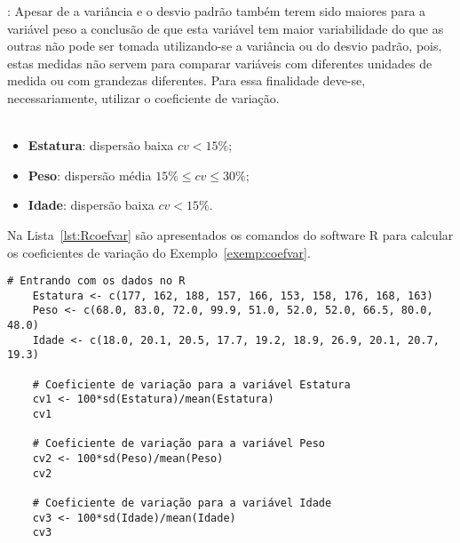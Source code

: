 \documentclass[11pt,fleqn]{book} %
\begin{document}
\begin{example}
: Apesar de a variância e o desvio padrão também terem sido maiores para a variável peso a conclusão de que esta variável tem maior variabilidade do que as outras não pode ser tomada utilizando-se a variância ou do desvio padrão, pois, estas medidas não servem para comparar variáveis com diferentes unidades de medida ou com grandezas diferentes. Para essa finalidade deve-se, necessariamente, utilizar o coeficiente de variação. \\

\vspace{0,3cm}
 \\

\begin{itemize}
\item {\bf Estatura}: dispersão baixa $cv < 15\%$;
\item {\bf Peso}: dispersão média $15\% \leq cv \leq 30\%$;
\item {\bf Idade}: dispersão baixa $cv < 15\%$.
\end{itemize}

\end{example}

\vspace{0,3cm}

Na Lista~\ref{lst:Rcoefvar} são apresentados os comandos do software R para calcular os coeficientes de variação do Exemplo~\ref{exemp:coefvar}. \\

\begin{scriptsize}
	\estiloR
	\begin{lstlisting}[caption={Comandos do software R}, label=lst:Rcoefvar]
	# Entrando com os dados no R
	Estatura <- c(177, 162, 188, 157, 166, 153, 158, 176, 168, 163)
	Peso <- c(68.0, 83.0, 72.0, 99.9, 51.0, 52.0, 52.0, 66.5, 80.0, 48.0)
	Idade <- c(18.0, 20.1, 20.5, 17.7, 19.2, 18.9, 26.9, 20.1, 20.7, 19.3)
	
	# Coeficiente de variação para a variável Estatura
	cv1 <- 100*sd(Estatura)/mean(Estatura)
	cv1
	
	# Coeficiente de variação para a variável Peso
	cv2 <- 100*sd(Peso)/mean(Peso)
	cv2
	
	# Coeficiente de variação para a variável Idade
	cv3 <- 100*sd(Idade)/mean(Idade)
	cv3

	\end{lstlisting}
\end{scriptsize}


\end{document}

